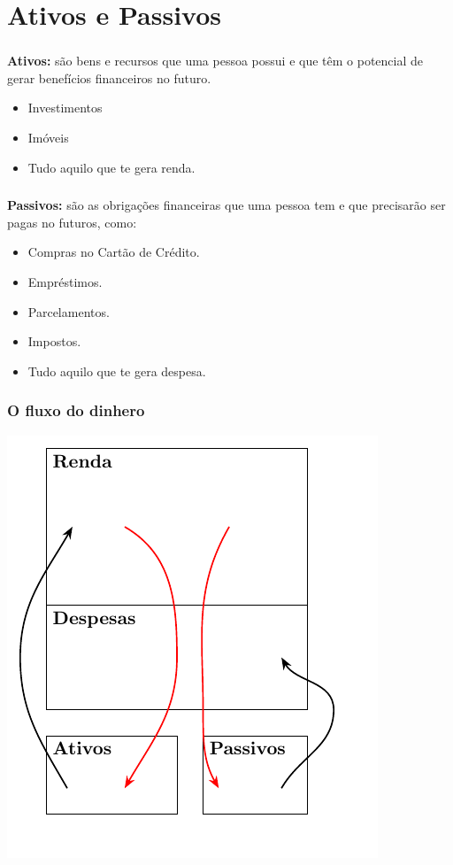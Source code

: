 \section{Ativos e Passivos}

\begin{frame}[c]\frametitle{}

  \textbf{Ativos:} são bens e recursos que uma pessoa possui e que têm o potencial de gerar benefícios financeiros no futuro.
  \begin{itemize}
    \item Investimentos
    \item Imóveis
    \item Tudo aquilo que te gera renda.
  \end{itemize}
\end{frame}


\begin{frame}[c]\frametitle{}
  \textbf{Passivos:} são as obrigações financeiras que uma pessoa tem e que precisarão ser pagas no futuros, como:
  \begin{itemize}
    \item Compras no Cartão de Crédito.
    \item Empréstimos.
    \item Parcelamentos.
    \item Impostos.
    \item Tudo aquilo que te gera despesa.
  \end{itemize}
\end{frame}


\begin{frame}[c]\frametitle{O fluxo do dinhero}
  \begin{center}
    \includegraphics{../figuras/pai_rico}
  \end{center}
\end{frame}


